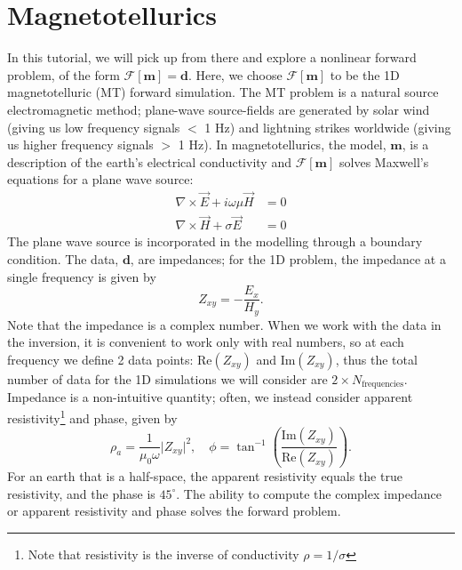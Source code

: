\documentclass[11pt,oneside]{article}
\begin{document}
\section{Magnetotellurics}
In this tutorial, we will pick up from there and explore a nonlinear forward problem, of the form $\mathcal{F}[\mathbf{m}] = \mathbf{d}$. Here, we choose $\mathcal{F}[\mathbf{m}]$ to be the 1D magnetotelluric (MT) forward simulation. The MT problem is a natural source electromagnetic method; plane-wave source-fields are generated by solar wind (giving us low frequency signals $<$ 1 Hz) and lightning strikes worldwide (giving us higher frequency signals $>$ 1 Hz). In magnetotellurics, the model, $\mathbf{m}$, is a description of the earth’s electrical conductivity and $\mathcal{F}[\mathbf{m}]$ solves Maxwell’s equations for a plane wave source:
\begin{equation}
\begin{split}
\nabla \times \vec{E} + i\omega\mu\vec{H} &= 0 \\
\nabla \times \vec{H} + \sigma\vec{E} &= 0
\end{split}
\label{eq:maxwell}
\end{equation}
The plane wave source is incorporated in the modelling through a boundary condition. The data, $\mathbf{d}$, are impedances; for the 1D problem, the impedance at a single frequency is given by
\begin{equation}
Z_{xy} = -\frac{E_x}{H_y}.
\label{eq:impedance}
\end{equation}
Note that the impedance is a complex number. When we work with the data in the inversion, it is convenient to work only with real numbers, so at each frequency we define 2 data points: $\text{Re}(Z_{xy})$ and $\text{Im}(Z_{xy})$, thus the total number of data for the 1D simulations we will consider are $2 \times N_{\text{frequencies}}$. Impedance is a non-intuitive quantity; often, we instead consider apparent resistivity\footnote{Note that resistivity is the inverse of conductivity $\rho = 1/\sigma$} and phase, given by
\begin{equation}
\rho_a = \frac{1}{\mu_0\omega} \big|Z_{xy}\big|^2,
\quad
\phi = \tan^{-1}\left(\frac{\text{Im}(Z_{xy})}{\text{Re}(Z_{xy})}\right).
\label{eq:rhoa_phase}
\end{equation}
For an earth that is a half-space, the apparent resistivity equals the true resistivity, and the phase is $45^{\circ}$. The ability to compute the complex impedance or apparent resistivity and phase solves the forward problem.
\end{document}
